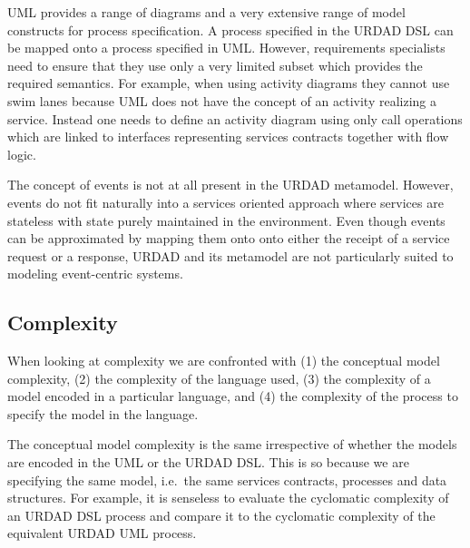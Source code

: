 UML provides a range of diagrams and a very extensive range of model constructs for process specification. A process specified in the URDAD DSL can be mapped onto a process specified in UML. However, requirements specialists need to ensure that they use only a very limited subset which provides the required semantics. For example, when using activity diagrams they cannot use swim lanes because UML does not have the concept of an activity realizing a service. Instead one needs to define an activity diagram using only call operations which are linked to interfaces representing services contracts together with flow logic.

The concept of events is not at all present in the URDAD metamodel. However, events do not fit naturally into a services oriented approach where services are stateless with state purely maintained in the environment. Even though events can be approximated by mapping them onto onto either the receipt of a service request or a response, URDAD and its metamodel are not particularly suited to modeling event-centric systems.


\subsection{Complexity}

When looking at complexity we are confronted with (1) the conceptual model complexity, (2) the complexity of the language used, (3) the complexity of a model encoded in a particular language, and (4) the complexity of the process to specify the model in the language. 

The conceptual model complexity is the same irrespective of whether the models are encoded in the UML or the URDAD DSL. This is so because we are specifying the same model, i.e.\ the same services contracts, processes and data structures. For example, it is senseless to evaluate the cyclomatic complexity \cite{mccabe_complexity_1976} of an URDAD DSL process and compare it to the cyclomatic complexity of the equivalent URDAD UML process.

